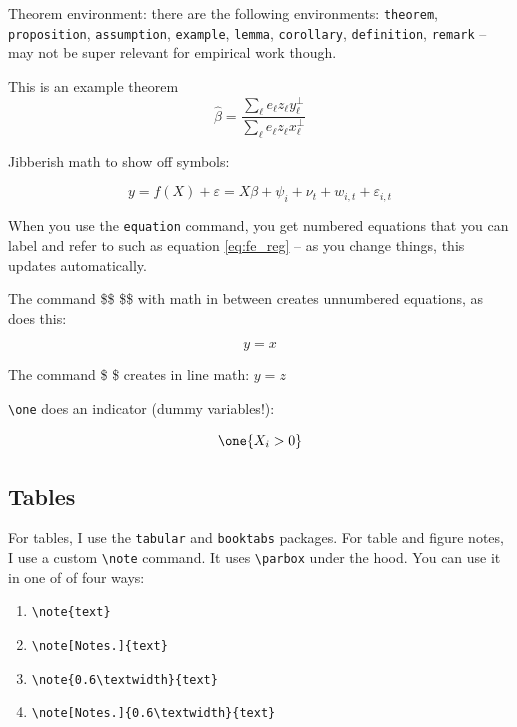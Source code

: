 \documentclass[12pt]{article}
\begin{document}
Theorem environment: there are the following environments: \texttt{theorem}, \texttt{proposition}, \texttt{assumption}, \texttt{example}, \texttt{lemma}, \texttt{corollary}, \texttt{definition}, \texttt{remark} -- may not be super relevant for empirical work though. 

\begin{theorem}\label{thm:residue_thm}
  This is an example theorem \[
    \hat{\beta}=\frac{\sum_{\ell}e_{\ell}z_{\ell}y_{\ell}^{\perp}}{\sum_{\ell}e_{\ell}z_{\ell}x_{\ell}^{\perp}}
  \]
\end{theorem}

Jibberish math to show off symbols:

\begin{equation}\label{eq:fe_reg}
  y = f(X) + \varepsilon = X \beta + \psi_i + \nu_t + w_{i,t} + \varepsilon_{i,t}
\end{equation}

When you use the \texttt{equation} command, you get numbered equations that you can label and refer to such as equation \ref{eq:fe_reg} -- as you change things, this updates automatically.

The command \$\$ \$\$ with math in between creates unnumbered equations, as does this: 

\begin{equation*}
y=x
\end{equation*}

The command \$ \$ creates in line math: $y=z$

\bigskip

\texttt{\textbackslash one} does an indicator (dummy variables!): 

$$\one{X_i > 0}$$



\subsection{Tables}

For tables, I use the \texttt{tabular} and \texttt{booktabs} packages. For table and figure notes, I use a custom \texttt{\textbackslash note} command. It uses \texttt{\textbackslash parbox} under the hood. You can use it in one of of four ways:
\begin{enumerate}
  \item \texttt{\textbackslash note\{text\}}
  \item \texttt{\textbackslash note[Notes.]\{text\}}
  \item \texttt{\textbackslash note\{0.6\textbackslash textwidth\}\{text\}}
  \item \texttt{\textbackslash note[Notes.]\{0.6\textbackslash textwidth\}\{text\}}
\end{enumerate}
\end{document}
